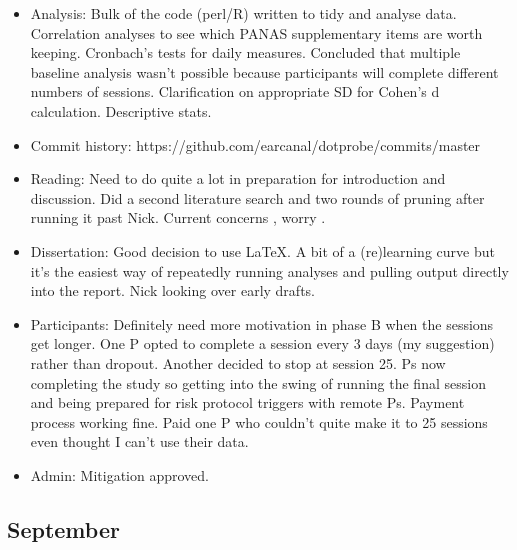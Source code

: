 \documentclass[british]{article}
\begin{document}
\begin{itemize}
  \item Analysis: Bulk of the code (perl/R) written to tidy and analyse
  data. Correlation analyses to see which PANAS supplementary items are
  worth keeping. Cronbach's tests for daily measures. Concluded that
  multiple baseline analysis wasn't possible because participants will
  complete different numbers of sessions. Clarification on appropriate
  SD for Cohen's d calculation. Descriptive stats.

  \item Commit history: https://github.com/earcanal/dotprobe/commits/master

  \item Reading: Need to do quite a lot in preparation
  for introduction and discussion. Did a second literature
  search and two rounds of pruning after running it past Nick.
  Current concerns \parencite{klinger_motivation_2011}, worry
  \parencite{borkovec_preliminary_1983}.

  \item Dissertation: Good decision to use LaTeX. A bit of a (re)learning
  curve but it's the easiest way of repeatedly running analyses and
  pulling output directly into the report. Nick looking over early drafts.

  \item Participants: Definitely need more motivation in phase B when
  the sessions get longer. One P opted to complete a session every 3 days
  (my suggestion) rather than dropout. Another decided to stop at session
  25. Ps now completing the study so getting into the swing of running
  the final session and being prepared for risk protocol triggers with
  remote Ps. Payment process working fine. Paid one P who couldn't quite
  make it to 25 sessions even thought I can't use their data.

  \item Admin: Mitigation approved.
\end{itemize}

\subsection{September}
\end{document}
